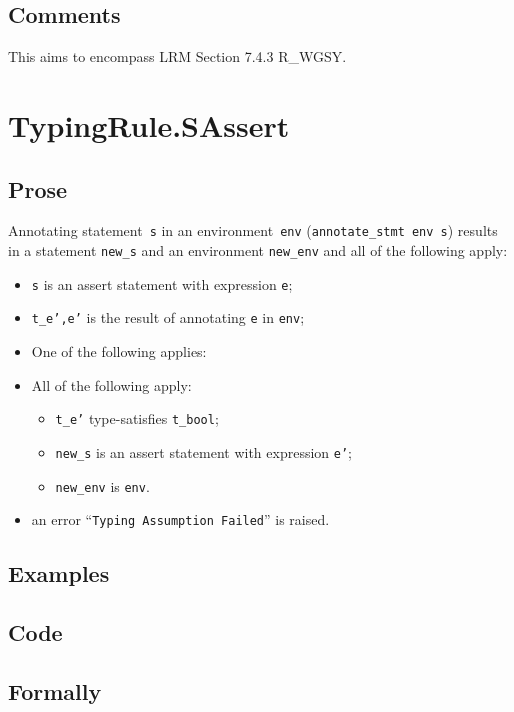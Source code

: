 \documentclass{book}
\begin{document}
  \subsection{Comments}
    This aims to encompass LRM Section 7.4.3 R\_WGSY.
  
\section{TypingRule.SAssert \label{sec:TypingRule.SAssert}}

  \subsection{Prose}
Annotating statement~\texttt{s} in an environment~\texttt{env}
(\texttt{annotate\_stmt env s}) results in a statement \texttt{new\_s} and an
environment \texttt{new\_env} and all of the following apply:
   \begin{itemize}
   \item \texttt{s} is an assert statement with expression \texttt{e};
   \item \texttt{t\_e',e'} is the result of annotating \texttt{e} in \texttt{env};
   \item One of the following applies:
     \item All of the following apply:
       \begin{itemize}
       \item \texttt{t\_e'} type-satisfies \texttt{t\_bool};  
       \item \texttt{new\_s} is an assert statement with expression \texttt{e'};
       \item \texttt{new\_env} is \texttt{env}.
       \end{itemize}
     \item an error ``\texttt{Typing Assumption Failed}'' is raised.
   \end{itemize}

  \subsection{Examples}

  \subsection{Code}

  \subsection{Formally}
\end{document}
